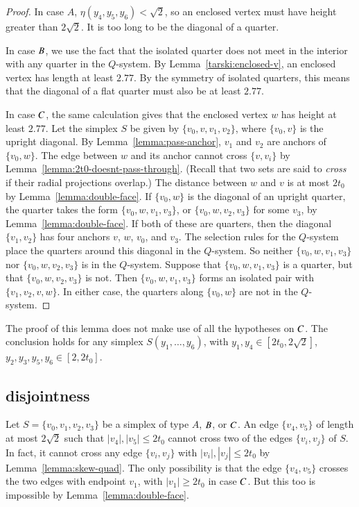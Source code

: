 \begin{proof}
In case $A$, $\eta(y_4,y_5,y_6)<\sqrt{2}$, so an enclosed vertex
must have height greater than $2\sqrt{2}$.  It is too long to be
the diagonal of a quarter.

In case $B$, we use the fact that the isolated quarter does not
meet in the interior with any quarter in the $Q$-system. 
By Lemma~\ref{tarski:enclosed-v}, an
enclosed vertex has length at least $2.77$.
By the symmetry of isolated quarters, this means that the diagonal
of a flat quarter must also be at least $2.77$.

In case $C$, the same calculation gives that the enclosed vertex
$w$ has height at least $2.77$.  Let the simplex $S$ be given by
$\{v_0,v,v_1,v_2\}$, where $\{v_0,v\}$ is the upright diagonal. By
Lemma~\ref{lemma:pass-anchor}, $v_1$ and $v_2$ are anchors of
$\{v_0,w\}$. The edge between $w$ and its anchor cannot cross
$\{v,v_i\}$ by Lemma~\ref{lemma:2t0-doesnt-pass-through}. (Recall
that two sets are said to {\it cross\/} if their radial
projections overlap.) The distance between $w$ and $v$ is at most
$2t_0$ by Lemma~\ref{lemma:double-face}. If $\{v_0,w\}$ is the
diagonal of an upright quarter, the quarter takes the form
$\{v_0,w,v_1,v_3\}$, or $\{v_0,w,v_2,v_3\}$ for some $v_3$, by
Lemma~\ref{lemma:double-face}. If both of these are quarters, then
the diagonal $\{v_1,v_2\}$ has four anchors $v$, $w$, $v_0$, and
$v_3$. The selection rules for the $Q$-system place the quarters
around this diagonal in the $Q$-system. So neither $\{v_0,w,v_1,v_3\}$
nor $\{v_0,w,v_2,v_3\}$ is in the $Q$-system. Suppose that
$\{v_0,w,v_1,v_3\}$ is a quarter, but that $\{v_0,w,v_2,v_3\}$ is not.
Then $\{v_0,w,v_1,v_3\}$ forms an isolated pair with $\{v_1,v_2,v,w\}$.
In either case, the quarters along $\{v_0,w\}$ are not in the
$Q$-system.
\end{proof}

\begin{remark}  The proof of this lemma does not make use of all the hypotheses
on $C$.  The conclusion holds for any simplex
$S(y_1,\ldots,y_6)$, with $y_1,y_4\in[2t_0,2\sqrt{2}]$,
$y_2,y_3,y_5,y_6\in[2,2t_0]$.
\end{remark}

\subsection{disjointness}%

Let $S=\{v_0,v_1,v_2,v_3\}$ be a simplex of type $A$, $B$, or
$C$. An edge $\{v_4,v_5\}$ of length at most $2\sqrt{2}$ such
that $|v_4|,|v_5|\le 2t_0$ cannot cross two of the edges
$\{v_i,v_j\}$ of $S$.  In fact, it cannot cross any edge $\{v_i,v_j\}$
with $|v_i|,|v_j|\le 2t_0$ by Lemma~\ref{lemma:skew-quad}.  The
only possibility is that the edge $\{v_4,v_5\}$ crosses the two
edges with endpoint $v_1$, with $|v_1|\ge2t_0$ in case $C$.  But
this too is impossible by Lemma~\ref{lemma:double-face}.

